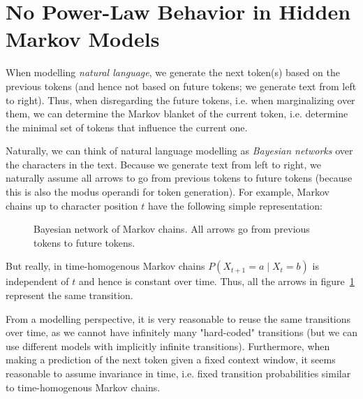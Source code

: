 \documentclass[../../main.tex]{subfiles}
\begin{document}
\section{No Power-Law Behavior in Hidden Markov Models}
    \label{section:no_power-law_in_hidden_markov_models}
    When modelling \emph{natural language}, we generate the next token(s) based on the previous tokens (and hence not based on future tokens; we generate text from left to right). Thus, when disregarding the future tokens, i.e. when marginalizing over them, we can determine the Markov blanket of the current token, i.e. determine the minimal set of tokens that influence the current one.

    Naturally, we can think of natural language modelling as \emph{Bayesian networks} over the characters in the text. Because we generate text from left to right, we naturally assume all arrows to go from previous tokens to future tokens (because this is also the modus operandi for token generation). For example, Markov chains up to character position $t$ have the following simple representation:

    \begin{figure}[h]
        \center
        \caption{Bayesian network of Markov chains. All arrows go from previous tokens to future tokens.}
        \label{fig:bayesian_network_markov_chain}
    \end{figure}

    But really, in time-homogenous Markov chains $P(X_{t + 1} = a \mid X_t = b)$ is independent of $t$ and hence is constant over time. Thus, all the arrows in figure~\ref{fig:bayesian_network_markov_chain} represent the same transition.

    From a modelling perspective, it is very reasonable to reuse the same transitions over time, as we cannot have infinitely many "hard-coded" transitions (but we can use different models with implicitly infinite transitions). Furthermore, when making a prediction of the next token given a fixed context window, it seems reasonable to assume invariance in time, i.e. fixed transition probabilities similar to time-homogenous Markov chains.
\end{document}
